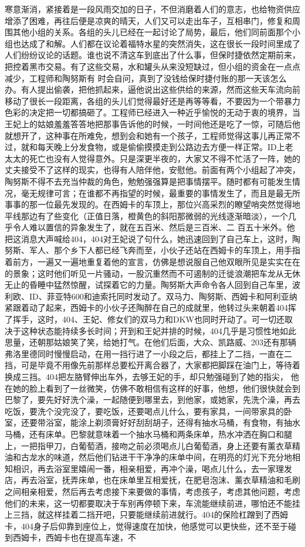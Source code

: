 \documentclass{article}
\begin{document}
寒意渐消，紧接着是一段风雨交加的日子，不但消磨着人们的意志，也给物资供应增添了困难，再往后便是凉爽的晴天，人们又可以走出车子，互相串门，修复和周围其他小组的关系。各组的头儿已经在一起讨论了局势，最后，他们同前面那个小组也达成了和解。人们都在议论着福特水星的突然消失，这在很长一段时间里成了人们纷纷议论的话题。谁也说不清这车到底出了什么事，但保时捷依然定期前来，把控着黑市交易。有了这些交易，水和罐头从来没短缺过，但小组的资金在一点点减少，工程师和陶努斯有
\newpage
时会自问，真到了没钱给保时捷付账的那一天该怎么办。有人提出偷袭，把他抓起来，逼他说出这些供给的来源，然而这些天车流向前移动了很长一段距离，各组的头儿们觉得最好还是再等等看，不要因为一个带暴力色彩的决定把一切都搞砸了。工程师已经进入一种近乎愉悦的无动于衷的境界，当王妃上的姑娘羞羞答答地把那事告诉他的时候，一时间他还是吃了一惊，可随后他就想开了，这种事在所难免，想到会和她有一个孩子，工程师觉得这事儿再正常不过，就和每天晚上分发食物，或是偷偷摸摸走到公路边去方便一样正常。ID上老太太的死亡也没有人觉得意外。只是深更半夜的，大家又不得不忙活了一阵，她的丈夫接受不了这样的现实，也得有人陪伴他，安慰他。前面有两个小组起了冲突，陶努斯不得不去充当仲裁的角色，勉勉强强算是把事情摆平。随时都有可能发生情况，毫无规律可言；在谁都不再指望的时候，最重要的事情发生了，而且是最无所事事的那一位最先发现的。在西姆卡的车顶上，那位兴高采烈的瞭望哨突然觉得地平线那边有了些变化（正值日落，橙黄色的斜阳那微弱的光线逐渐暗淡），一个几乎令人难以置信的异象发生了，就在五百米、然后是三百米、二
\newpage
百五十米外。他把这消息大声喊给404，404对王妃说了句什么，她迅速回到了自己车上，这时，陶努斯、军人、那个乡下人都已经飞奔而至，小伙子还站在西姆卡的车顶上，用手指着前方，一遍又一遍地重复着他的宣言，仿佛是想说服自己他双眼所见是实实在在的景象；这时他们听见一片骚动，一股沉重然而不可遏制的迁徙浪潮把车龙从无休无止的昏睡中猛然惊醒，试探着它的力量。陶努斯大声命令各人回到自己车里，波利欧、ID、菲亚特600和迪索托同时发动了。双马力、陶努斯、西姆卡和阿利亚纳紧跟着动了起来，西姆卡的小伙子还陶醉在自己的成就里，他转过头来朝着404挥了挥手，这时，404、王妃、修女们的双马力和DKW也同时开动了。可一切还取决于这种状态能持续多长时间；开到和王妃并排的时候，404几乎是习惯性地如此思量，还朝那姑娘笑了笑，给她打气。在他们后面，大众、凯路威、203还有那辆弗洛里德同时慢慢启动，在用一挡行进了一小段之后，都挂上了二挡，一直在二挡，可是毕竟不用像先前那样总要松开离合器了，大家都把脚踩在油门上，等待着换成三挡。404把左胳臂伸出车外，去够王妃的手，却只勉强碰到了她的指尖，
\newpage
他在她的脸上看到了一丝微笑，仿佛不敢相信有这样的好事，他想，他们很快就会到巴黎了，要先好好洗个澡，一起随便到哪里去，到他家，或她家，先洗个澡，再去吃饭，要洗个没完没了，要吃饭，还要喝点儿什么，要有家具，一间带家具的卧室，还要带浴室，能涂上剃须膏好好刮刮胡子，还得有抽水马桶，有食物，有抽水马桶，还有床单。巴黎就意味着一个抽水马桶和两条床单，热水冲洒在胸口和腿上，一把指甲刀，白葡萄酒，接吻之前必须喝点儿白葡萄酒，身上还要有薰衣草精油和古龙水的味道，然后他们钻进干干净净的床单中间，在明亮的灯光下充分地相知相识，再去浴室里嬉闹一番，相亲相爱，再冲个澡，喝点儿什么，去一家理发店，再去浴室，抚弄床单，也在床单里互相爱抚，在肥皂泡沫、薰衣草精油和毛刷之间相亲相爱，然后再去考虑接下来要做的事情，考虑孩子，考虑其他问题，考虑他们的未来，这一切都要取决于车别再停顿下来，车流能继续前进，哪怕还不能挂上三挡，就这样挂着二挡开吧，只要能继续前进就行。404的保险杠蹭到了西姆卡，404身子后仰靠到座位上，觉得速度在加快，他感觉可以更快些，还不至于碰到西姆卡，西姆卡也在提高车速，不
\end{document}

